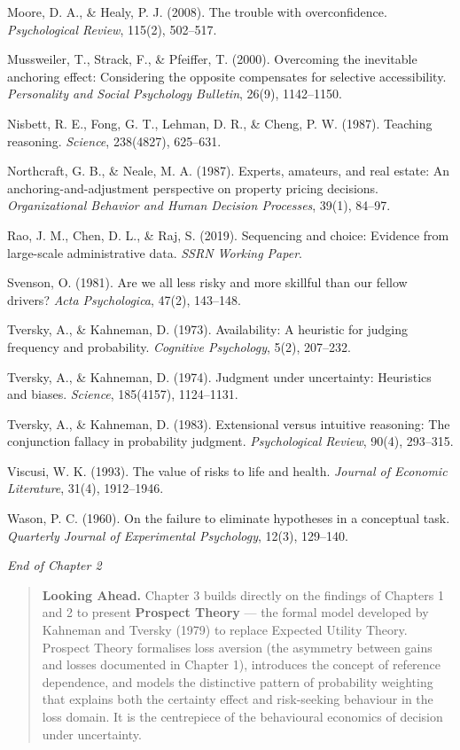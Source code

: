 \documentclass[12pt, letterpaper]{article}
\begin{document}
Moore, D. A., \& Healy, P. J. (2008). The trouble with overconfidence. \textit{Psychological Review}, 115(2), 502--517.

Mussweiler, T., Strack, F., \& Pfeiffer, T. (2000). Overcoming the inevitable anchoring effect: Considering the opposite compensates for selective accessibility. \textit{Personality and Social Psychology Bulletin}, 26(9), 1142--1150.

Nisbett, R. E., Fong, G. T., Lehman, D. R., \& Cheng, P. W. (1987). Teaching reasoning. \textit{Science}, 238(4827), 625--631.

Northcraft, G. B., \& Neale, M. A. (1987). Experts, amateurs, and real estate: An anchoring-and-adjustment perspective on property pricing decisions. \textit{Organizational Behavior and Human Decision Processes}, 39(1), 84--97.

Rao, J. M., Chen, D. L., \& Raj, S. (2019). Sequencing and choice: Evidence from large-scale administrative data. \textit{SSRN Working Paper}.

Svenson, O. (1981). Are we all less risky and more skillful than our fellow drivers? \textit{Acta Psychologica}, 47(2), 143--148.

Tversky, A., \& Kahneman, D. (1973). Availability: A heuristic for judging frequency and probability. \textit{Cognitive Psychology}, 5(2), 207--232.

Tversky, A., \& Kahneman, D. (1974). Judgment under uncertainty: Heuristics and biases. \textit{Science}, 185(4157), 1124--1131.

Tversky, A., \& Kahneman, D. (1983). Extensional versus intuitive reasoning: The conjunction fallacy in probability judgment. \textit{Psychological Review}, 90(4), 293--315.

Viscusi, W. K. (1993). The value of risks to life and health. \textit{Journal of Economic Literature}, 31(4), 1912--1946.

Wason, P. C. (1960). On the failure to eliminate hypotheses in a conceptual task. \textit{Quarterly Journal of Experimental Psychology}, 12(3), 129--140.

\medskip

\textit{End of Chapter 2}

\medskip

\begin{quote}
\textbf{Looking Ahead.} Chapter 3 builds directly on the findings of Chapters 1 and 2 to present \textbf{Prospect Theory} --- the formal model developed by Kahneman and Tversky (1979) to replace Expected Utility Theory. Prospect Theory formalises loss aversion (the asymmetry between gains and losses documented in Chapter 1), introduces the concept of reference dependence, and models the distinctive pattern of probability weighting that explains both the certainty effect and risk-seeking behaviour in the loss domain. It is the centrepiece of the behavioural economics of decision under uncertainty.
\end{quote}
\end{document}
